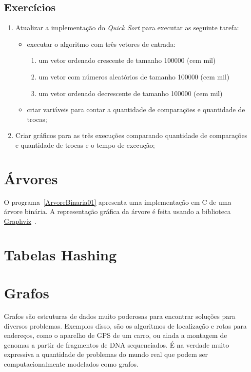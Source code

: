 \documentclass[11pt,fleqn]{book} %
\begin{document}
\subsection*{Exercícios}
\begin{enumerate}
	\item Atualizar a implementação do \textit{Quick Sort} para executar as seguinte tarefa:
	\begin{itemize}
		\item executar o algoritmo com três vetores de entrada:
		\begin{enumerate}
			\item um vetor ordenado crescente de tamanho 100000 (cem mil)
			\item um vetor com números aleatórios de tamanho 100000 (cem mil)
			\item um vetor ordenado decrescente de tamanho 100000 (cem mil)
		\end{enumerate} 
		\item criar variáveis para contar a quantidade de comparações e quantidade de trocas;
	\end{itemize} 
	\item Criar gráficos para as três execuções comparando quantidade de comparações e quantidade de trocas e o tempo de execução;
\end{enumerate} 

\newpage
\section{Árvores}\label{arvores}

O  programa~\ref{ArvoreBinaria01} apresenta uma implementação em C de uma árvore binária.
A representação gráfica da árvore é feita usando a biblioteca \href{http://graphviz.org/}{Graphviz}~\cite{Ellson03graphvizand}.

\label{ArvoreBinaria01}

\section{Tabelas Hashing}\label{hashing}

\section{Grafos}\label{grafos}

Grafos são estruturas de dados muito poderosas para encontrar soluções para diversos problemas.
Exemplos disso, são os algoritmos de localização e rotas para endereços, como o aparelho de GPS de um carro, ou ainda a montagem de genomas a partir de fragmentos de DNA sequenciados.
É na verdade muito expressiva a quantidade de problemas do mundo real que podem ser computacionalmente modelados como grafos.
\end{document}
